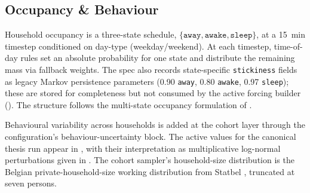 \subsection{Occupancy \& Behaviour}
\label{sec:input_occupancy_behaviour}
Household occupancy is a three-state schedule, $\{\texttt{away},\texttt{awake},\texttt{sleep}\}$, at a \SI{15}{min} timestep conditioned on day-type (weekday/weekend). At each timestep, time-of-day rules set an absolute probability for one state and distribute the remaining mass via fallback weights. The spec also records state-specific \texttt{stickiness} fields as legacy Markov persistence parameters (\num{0.90} \texttt{away}, \num{0.80} \texttt{awake}, \num{0.97} \texttt{sleep}); these are stored for completeness but not consumed by the active forcing builder (). The structure follows the multi-state occupancy formulation of \textcite{Richardson2010_DomesticHighRes}.

Behavioural variability across households is added at the cohort layer through the configuration's behaviour-uncertainty block. The active values for the canonical thesis run appear in , with their interpretation as multiplicative log-normal perturbations given in . The cohort sampler's household-size distribution is the Belgian private-household-size working distribution from Statbel \cite{Statbel2024Households}, truncated at seven persons.
 
